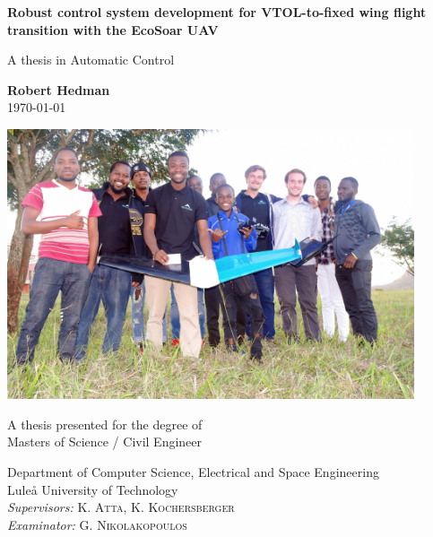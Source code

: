 \documentclass{article}
\begin{document}
\begin{titlepage}
    \begin{center}
 
        \huge
        \textbf{Robust control system development for VTOL-to-fixed wing flight transition with the EcoSoar UAV}
 
        \vspace{0.5cm}
        \LARGE
        A thesis in Automatic Control
 
        \vspace{1.5cm}
 
        \textbf{Robert Hedman\\}
        \today
        \vspace{0.6cm}

        \includegraphics[width=0.9\textwidth]{coverphoto.jpeg}
 
        \vfill
 
        A thesis presented for the degree of\\
        Masters of Science / Civil Engineer
 
        \vspace{0.6cm}
 
        \Large
        Department of Computer Science, Electrical and Space Engineering\\
        Luleå University of Technology\\
        \textit{Supervisors:} K. \textsc{Atta}, K. \textsc{Kochersberger}\\
        \textit{Examinator:} G. \textsc{Nikolakopoulos}
 
    \end{center}
\end{titlepage}
\end{document}
